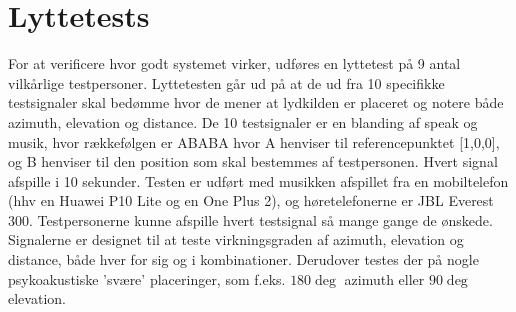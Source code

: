 \section{Lyttetests}
For at verificere hvor godt systemet virker, udføres en lyttetest på 9 antal vilkårlige testpersoner. Lyttetesten går ud på at de ud fra 10 specifikke testsignaler skal bedømme hvor de mener at lydkilden er placeret og notere både azimuth, elevation og distance. De 10 testsignaler er en blanding af speak og musik, hvor rækkefølgen er ABABA hvor A henviser til referencepunktet [1,0,0], og B henviser til den position som skal bestemmes af testpersonen. Hvert signal afspille i 10 sekunder.
Testen er udført med musikken afspillet fra en mobiltelefon (hhv en Huawei P10 Lite og en One Plus 2), og høretelefonerne er JBL Everest 300. Testpersonerne kunne afspille hvert testsignal så mange gange de ønskede. Signalerne er designet til at teste virkningsgraden af azimuth, elevation og distance, både hver for sig og i kombinationer. Derudover testes der på nogle psykoakustiske 'svære' placeringer, som f.eks. $180\deg$ azimuth eller $90\deg$ elevation.  

